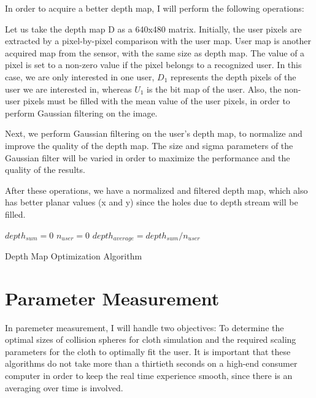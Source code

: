 In order to acquire a better depth map, I will perform the following operations:

Let us take the depth map D as a 640x480 matrix. Initially, the user pixels are
extracted by a pixel-by-pixel comparison with the user map. User map is another
acquired map from the sensor, with the same size as depth map. The value of a
pixel is set to a non-zero value if the pixel belongs to a recognized user. In
this case, we are only interested in one user, $D_1$ represents the depth pixels
of the user we are interested in, whereas $U_1$ is the bit map of the user.
Also, the non-user pixels must be filled with the mean value of the user pixels, in order to perform Gaussian filtering on the image.

Next, we perform Gaussian filtering on the user’s depth map, to normalize and
improve the quality of the depth map. The size and sigma parameters of the Gaussian filter will be varied in order to maximize the performance and the quality of the results. 

After these operations, we have a normalized and filtered depth map, which also
has better planar values (x and y) since the holes due to depth stream will be filled.

\begin{algorithm}
\dontprintsemicolon %
$depth_{sum}=0$ \;
$n_{user} =0$\;
$depth_{average}=depth_{sum}/n_{user}$ \;
 
\caption{Depth Map Optimization Algorithm}
\label{algo:depth_patch}
\end{algorithm}

\section{Parameter Measurement}
In paremeter measurement, I will handle two objectives: To determine the optimal
sizes of collision spheres for cloth simulation and the required scaling parameters for the cloth to optimally fit the user. It is important that these algorithms do not take more than a thirtieth seconds on a high-end consumer computer in order to keep the real time experience smooth, since there is an averaging over time is involved.

